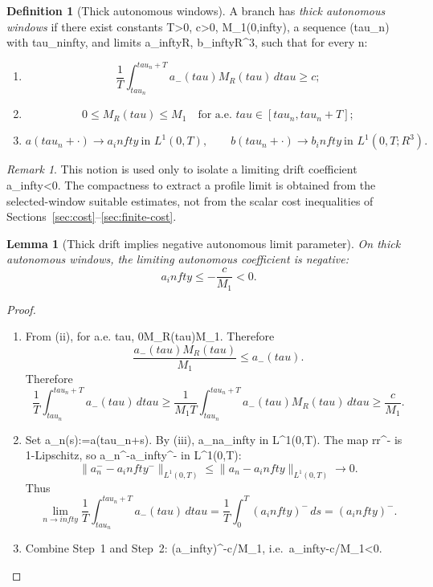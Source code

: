 \documentclass[11pt]{amsart}
\def\({}%
\def\){}%
\def\mathbb#1{#1}%
\def\tau{tau}%
\def\infty{infty}%
\theoremstyle{plain}
\newtheorem{lemma}[theorem]{Lemma}
\theoremstyle{definition}
\newtheorem{definition}[theorem]{Definition}
\theoremstyle{remark}
\newtheorem{remark}[theorem]{Remark}
\begin{document}
\begin{definition}[Thick autonomous windows]\label{def:thick-autonomous-windows}
A branch has \emph{thick autonomous windows} if there exist constants
\(T>0\), \(c>0\), \(M_1\in(0,\infty)\), a sequence \((\tau_n)\) with
\(\tau_n\to\infty\), and limits \(a_\infty\in\mathbb R\),
\(b_\infty\in\mathbb R^3\), such that for every \(n\):
\begin{enumerate}[label=(\roman*)]
  \item
  \[
    \frac1T\int_{\tau_n}^{\tau_n+T}a_-(\tau)M_R(\tau)
    \,d\tau\ge c;
  \]
  \item
  \[
    0\le M_R(\tau)\le M_1\quad\text{for a.e. }\tau\in[\tau_n,\tau_n+T];
  \]
  \item
  \[
    a(\tau_n+\cdot)\to a_\infty\ \text{in }L^1(0,T),
    \qquad
    b(\tau_n+\cdot)\to b_\infty\ \text{in }L^1(0,T;\mathbb R^3).
  \]
\end{enumerate}
\end{definition}
\begin{remark}
This notion is used only to isolate a limiting drift coefficient \(a_\infty<0\).  The
compactness to extract a profile limit is obtained from the selected-window suitable estimates,
not from the scalar cost inequalities of Sections~\ref{sec:cost}--\ref{sec:finite-cost}.
\end{remark}

\begin{lemma}[Thick drift implies negative autonomous limit parameter]\label{lem:negative-parameter}
On thick autonomous windows, the limiting autonomous coefficient is negative:
\[
  a_\infty\le-\frac{c}{M_1}<0.
\]
\end{lemma}

\begin{proof}
\begin{enumerate}[label=(\arabic*)]
  \item From (ii), for a.e. \(\tau\in[\tau_n,\tau_n+T]\),
  \(0\le M_R(\tau)\le M_1\).  Therefore
  \[
    \frac{a_-(\tau)M_R(\tau)}{M_1}
    \le a_-(\tau).
  \]
  Therefore
  \[
    \frac1T\int_{\tau_n}^{\tau_n+T}a_-(\tau)
    \,d\tau
    \ge \frac1{M_1T}\int_{\tau_n}^{\tau_n+T}a_-(\tau)M_R(\tau)
    \,d\tau
    \ge \frac{c}{M_1}.
  \]

  \item Set \(a_n(s):=a(\tau_n+s)\).  By (iii), \(a_n\to a_\infty\) in
  \(L^1(0,T)\). The map \(r\mapsto r^-\) is 1-Lipschitz, so
  \(a_n^-\to a_\infty^-\) in \(L^1(0,T)\):
  \[
    \|a_n^--a_\infty^-\|_{L^1(0,T)}\le
    \|a_n-a_\infty\|_{L^1(0,T)}\to0.
  \]
  Thus
  \[
  \lim_{n\to\infty}\frac1T\int_{\tau_n}^{\tau_n+T}a_-(\tau)
    \,d\tau
    =\frac1T\int_0^T(a_\infty)^-
    \,ds=(a_\infty)^-.
  \]

  \item Combine Step~1 and Step~2:
  \((a_\infty)^-\ge c/M_1\), i.e.\ \(a_\infty\le-c/M_1<0\).
\end{enumerate}
\end{proof}
\end{document}
